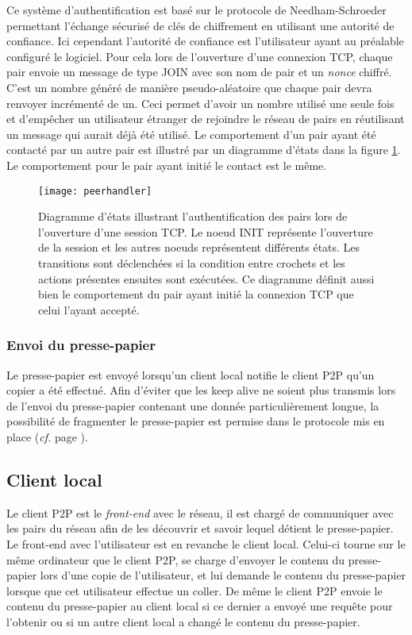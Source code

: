Ce système d'authentification est basé sur le protocole de Needham-Schroeder
\cite{1978Needham} permettant l'échange sécurisé de clés de chiffrement
en utilisant une autorité de confiance. Ici cependant l'autorité de confiance
est l'utilisateur ayant au préalable configuré le logiciel.
Pour cela lors de l'ouverture d'une connexion TCP, chaque
pair envoie un message de type JOIN avec son nom de pair et un
\emph{nonce} chiffré. C'est un nombre généré de manière pseudo-aléatoire que
chaque pair devra renvoyer incrémenté de un. Ceci permet d'avoir un nombre
utilisé une seule fois et d'empêcher un utilisateur étranger
de rejoindre le réseau de pairs en réutilisant un message qui aurait déjà
été utilisé. Le comportement d'un pair ayant été contacté par un autre pair
est illustré par un diagramme d'états dans la figure \ref{fig:peerhandler}.
Le comportement pour le pair ayant initié le contact est le même.

\begin{figure}[!h]
  \centering
  \texttt{[image: peerhandler]}
  \caption{Diagramme d'états illustrant l'authentification des pairs lors
    de l'ouverture d'une session TCP. Le noeud INIT représente l'ouverture
    de la session et les autres noeuds représentent différents états. Les
    transitions sont déclenchées si la condition entre crochets et les actions
    présentes ensuites sont exécutées. Ce diagramme définit aussi bien le
    comportement du pair ayant initié la connexion TCP que celui l'ayant
    accepté.}
  \label{fig:peerhandler}
\end{figure}

\subsubsection{Envoi du presse-papier}
Le presse-papier est envoyé lorsqu'un client local notifie le client
P2P qu'un copier a été effectué.
Afin d'éviter que les keep alive ne soient plus transmis lors
de l'envoi du presse-papier contenant une donnée particulièrement
longue, la possibilité de fragmenter le presse-papier est permise dans
le protocole mis en place (\emph{cf.} page \pageref{msg:data_p2p}).

\subsection{Client local}
Le client P2P est le \emph{front-end} avec le réseau, il est chargé
de communiquer avec les pairs du réseau afin de les découvrir et savoir
lequel détient le presse-papier. Le front-end avec l'utilisateur
est en revanche le client local. Celui-ci tourne sur le même ordinateur
que le client P2P, se charge d'envoyer le contenu du presse-papier
lors d'une copie de l'utilisateur, et lui demande le contenu du presse-papier
lorsque que cet utilisateur effectue un coller.
De même le client P2P envoie le contenu du presse-papier au client local si
ce dernier a envoyé une requête pour l'obtenir ou si un autre
client local a changé le contenu du presse-papier.

